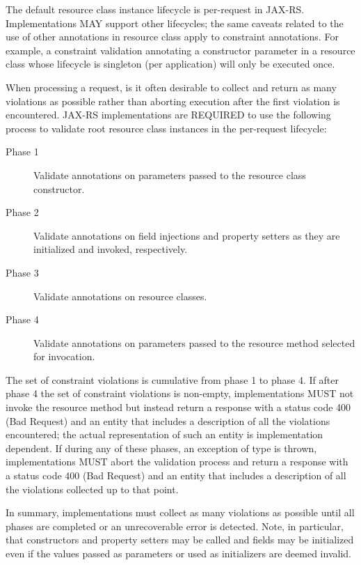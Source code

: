The default resource class instance lifecycle is per-request in JAX-RS. Implementations MAY support other lifecycles; the same caveats related to the use of other annotations in resource class apply to constraint annotations. For example, a constraint validation annotating a constructor parameter in a resource class whose lifecycle is singleton (per application) will only be executed once.

When processing a request, is it often desirable to collect and return as many violations as possible rather than aborting execution after the first violation is encountered. JAX-RS implementations are REQUIRED to use the following process to validate root resource class instances in the per-request lifecycle:

\begin{description}
\item[Phase 1] Validate annotations on parameters passed to the resource class constructor.
\item[Phase 2] Validate annotations on field injections and property setters as they are initialized and invoked, respectively.
\item[Phase 3] Validate annotations on resource classes.
\item[Phase 4] Validate annotations on parameters passed to the resource method selected for invocation.
\end{description}

The set of constraint violations is cumulative from phase 1 to phase 4. If after phase 4 the set of constraint violations is non-empty, implementations MUST not invoke the resource method but instead return a response with a status code 400 (Bad Request) and an entity that includes a description of all the violations encountered; the actual representation of such an entity is implementation dependent. If during any of these phases, an exception of type  is thrown, implementations MUST abort the validation process and return a response with a status code 400 (Bad Request) and an entity that includes a description of all the violations collected up to that point.

 In summary, implementations must collect as many violations as possible until all phases are completed or an unrecoverable error is detected. Note, in particular, that constructors and property setters may be called and fields may be initialized even if the values passed as parameters or used as initializers are deemed invalid.



